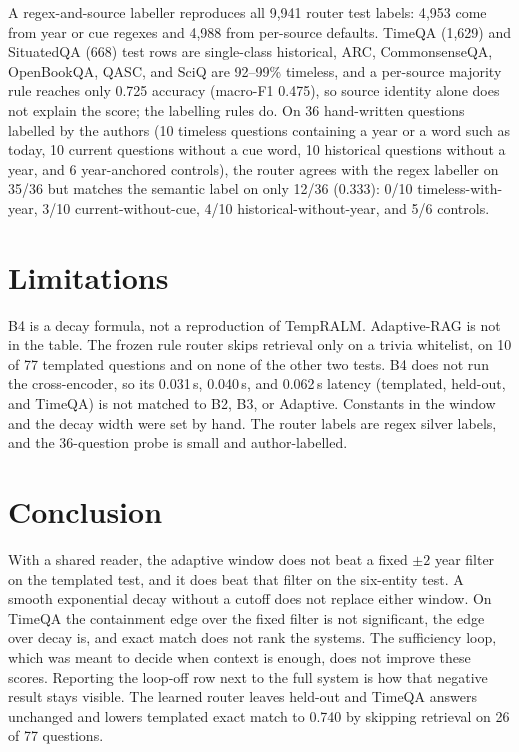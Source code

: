\documentclass[sigconf,anonymous,review]{acmart}
\begin{document}
A regex-and-source labeller reproduces all 9{,}941 router test labels: 4{,}953 come from year or cue regexes and 4{,}988 from per-source defaults.
TimeQA (1{,}629) and SituatedQA (668) test rows are single-class historical, ARC, CommonsenseQA, OpenBookQA, QASC, and SciQ are 92--99\% timeless, and a per-source majority rule reaches only 0.725 accuracy (macro-F1 0.475), so source identity alone does not explain the score; the labelling rules do.
On 36 hand-written questions labelled by the authors (10 timeless questions containing a year or a word such as today, 10 current questions without a cue word, 10 historical questions without a year, and 6 year-anchored controls), the router agrees with the regex labeller on 35/36 but matches the semantic label on only 12/36 (0.333): 0/10 timeless-with-year, 3/10 current-without-cue, 4/10 historical-without-year, and 5/6 controls.

\section{Limitations}

B4 is a decay formula, not a reproduction of TempRALM.
Adaptive-RAG is not in the table.
The frozen rule router skips retrieval only on a trivia whitelist, on 10 of 77 templated questions and on none of the other two tests.
B4 does not run the cross-encoder, so its 0.031\,s, 0.040\,s, and 0.062\,s latency (templated, held-out, and TimeQA) is not matched to B2, B3, or Adaptive.
Constants in the window and the decay width were set by hand.
The router labels are regex silver labels, and the 36-question probe is small and author-labelled.

\section{Conclusion}

With a shared reader, the adaptive window does not beat a fixed $\pm 2$ year filter on the templated test, and it does beat that filter on the six-entity test.
A smooth exponential decay without a cutoff does not replace either window.
On TimeQA the containment edge over the fixed filter is not significant, the edge over decay is, and exact match does not rank the systems.
The sufficiency loop, which was meant to decide when context is enough, does not improve these scores.
Reporting the loop-off row next to the full system is how that negative result stays visible.
The learned router leaves held-out and TimeQA answers unchanged and lowers templated exact match to 0.740 by skipping retrieval on 26 of 77 questions.



\end{document}
